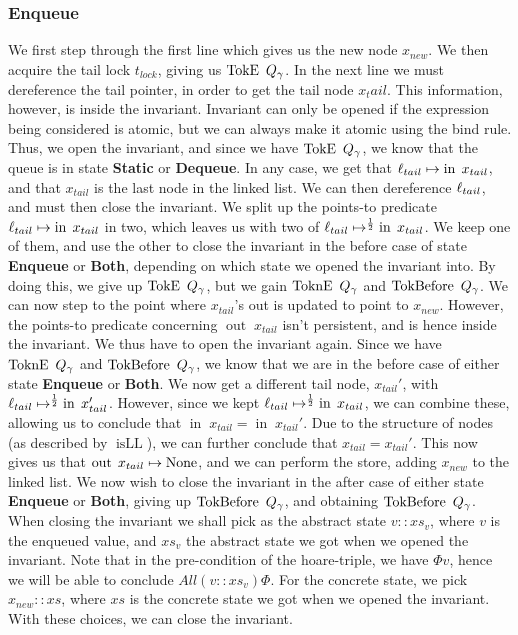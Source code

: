 \documentclass[twoside,11pt,openright]{report}
\newcommand{\isLL}{\operatorname{isLL}}
\newcommand{\nIn}[1]{\operatorname{in} \; #1}
\newcommand{\nOut}[1]{\operatorname{out} \; #1}
\newcommand{\StaticState}{\textbf{Static}}
\newcommand{\EnqueueState}{\textbf{Enqueue}}
\newcommand{\DequeueState}{\textbf{Dequeue}}
\newcommand{\BothState}{\textbf{Both}}
\newcommand{\Qg}{Q_\gname}
\newcommand{\TokE}[1]{\operatorname{TokE}\ #1}
\newcommand{\TokEQg}{\TokE{\Qg}}
\newcommand{\ToknE}[1]{\operatorname{ToknE}\ #1}
\newcommand{\ToknEQg}{\ToknE{\Qg}}
\newcommand{\TokBefore}[1]{\operatorname{TokBefore}\ #1}
\newcommand{\TokBeforeQg}{\TokBefore{\Qg}}
\newcommand{\TokAfterQg}{\TokBefore{\Qg}}
\begin{document}
\subsubsection{Enqueue}
We first step through the first line which gives us the new node $x_{new}$. We then acquire the tail lock $t_{lock}$, giving us $\TokEQg$. In the next line we must dereference the tail pointer, in order to get the tail node $x_tail$. This information, however, is inside the invariant. Invariant can only be opened if the expression being considered is atomic, but we can always make it atomic using the bind rule. Thus, we open the invariant, and since we have $\TokEQg$, we know that the queue is in state \StaticState{} or \DequeueState{}. In any case, we get that $\loc_{tail} \mapsto \nIn{x_{tail}}$, and that $x_{tail}$ is the last node in the linked list. We can then dereference $\ell_{tail}$, and must then close the invariant. We split up the points-to predicate $\loc_{tail} \mapsto \nIn{x_{tail}}$ in two, which leaves us with two of $\loc_{tail} \mapsto^{\frac{1}{2}} \nIn{x_{tail}}$. We keep one of them, and use the other to close the invariant in the before case of state \EnqueueState{} or \BothState{}, depending on which state we opened the invariant into. By doing this, we give up $\TokEQg$, but we gain $\ToknEQg$ and $\TokAfterQg$. We can now step to the point where $x_{tail}$'s out is updated to point to $x_{new}$. However, the points-to predicate concerning $\nOut{x_{tail}}$ isn't persistent, and is hence inside the invariant. We thus have to open the invariant again. Since we have $\ToknEQg$ and $\TokAfterQg$, we know that we are in the before case of either state \EnqueueState{} or \BothState{}. We now get a different tail node, $x_{tail}'$, with $\loc_{tail} \mapsto^{\frac{1}{2}} \nIn{x_{tail}'}$. However, since we kept $\loc_{tail} \mapsto^{\frac{1}{2}} \nIn{x_{tail}}$, we can combine these, allowing us to conclude that $\nIn{x_{tail}} = \nIn{x_{tail}'}$. Due to the structure of nodes (as described by $\isLL$), we can further conclude that $x_{tail} = x_{tail}'$. This now gives us that $\nOut{x_{tail}} \mapsto \None$, and we can perform the store, adding $x_{new}$ to the linked list. We now wish to close the invariant in the after case of either state \EnqueueState{} or \BothState{}, giving up $\TokAfterQg$, and obtaining $\TokBeforeQg$. When closing the invariant we shall pick as the abstract state $v :: xs_v$, where $v$ is the enqueued value, and $xs_v$ the abstract state we got when we opened the invariant. Note that in the pre-condition of the hoare-triple, we have $\Phi v$, hence we will be able to conclude $All (v :: xs_v) \Phi$. For the concrete state, we pick $x_{new} :: xs$, where $xs$ is the concrete state we got when we opened the invariant. With these choices, we can close the invariant.\\
\end{document}
